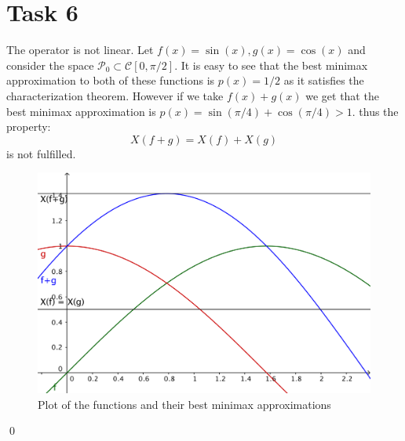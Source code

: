 \section*{Task 6}
The operator is not linear. Let $f(x) = \sin (x), g(x) = \cos (x)$ and consider the space $\mathcal{P}_0 \subset \mathcal{C}[0, \pi/2]$. It is easy to see that the best minimax approximation to both of these functions is $p(x) = 1/2$ as it satisfies the characterization theorem. However if we take $f(x)+g(x)$ we get that the best minimax approximation is $p(x) = \sin(\pi/4)+\cos(\pi/4)>1$. thus the property:
\begin{equation*}
X(f+g) = X(f) + X(g)
\end{equation*}
is not fulfilled.
\begin{figure}[h]
\centering 
\includegraphics[scale = 0.5]{figtask6.png}
\caption{Plot of the functions and their best minimax approximations}
\label{figtask6}
\end{figure}
\qed


